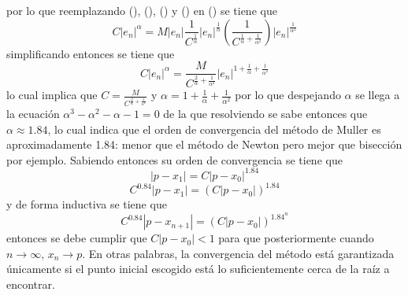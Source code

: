 por lo que reemplazando (), (), () y ()
en () se tiene que
\begin{equation*}
    C|e_n|^\alpha=M|e_n|\frac{1}{C^{\frac{1}{\alpha}}}|e_n|^{\frac{1}{\alpha}}\left(\frac{1}{C^{\frac{1}{\alpha}+\frac{1}{\alpha^2}}}\right)|e_n|^{\frac{1}{\alpha^2}}
\end{equation*}
simplificando entonces se tiene que
\begin{equation}
    \label{muller_order_eq}
    C|e_n|^\alpha=\frac{M}{C^{\frac{2}{\alpha}+\frac{1}{\alpha^2}}}|e_n|^{1+\frac{1}{\alpha}+\frac{1}{\alpha^2}}
\end{equation}
lo cual implica que $C=\frac{M}{C^{\frac{2}{\alpha}+\frac{1}{\alpha^2}}}$ y $\alpha=1+\frac{1}{\alpha}+\frac{1}{\alpha^2}$
por lo que despejando $\alpha$ se llega a la ecuación $\alpha^3-\alpha^2-\alpha-1=0$ de la que resolviendo se
sabe entonces que $\alpha \approx 1.84$, lo cual indica que el orden de convergencia del método de Muller es aproximadamente
1.84: menor que el método de Newton pero mejor que bisección por ejemplo. Sabiendo entonces su orden de convergencia se tiene que
\[|p-x_1|=C|p-x_0|^{1.84}\]
\[C^{0.84}|p-x_1|=\left(C|p-x_0|\right)^{1.84}\]
y de forma inductiva se tiene que
\begin{equation}
    \label{x_0_convergence}
    C^{0.84}|p-x_{n+1}|=(C|p-x_0|)^{1.84^{n}}
\end{equation}
entonces se debe cumplir que $C|p-x_0|<1$ para que posteriormente cuando $n\rightarrow\infty,\, x_n\rightarrow p$. En otras palabras,
la convergencia del método está garantizada únicamente si el punto inicial escogido está lo suficientemente cerca de la raíz a encontrar.